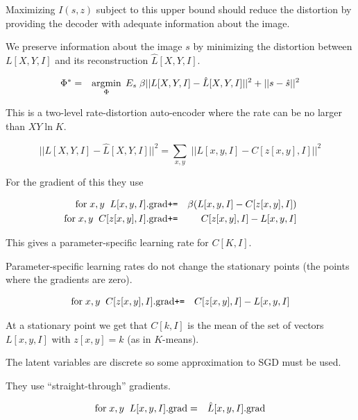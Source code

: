 {\vfill
Maximizing $I(s,z)$ subject to this upper bound should reduce the distortion by providing the decoder with adequate information
about the image.


We preserve information about the image $s$ by minimizing the distortion between $L[X,Y,I]$ and its reconstruction $\hat{L}[X,Y,I]$.

\vfill
\begin{eqnarray*}
\Phi^* & = & \operatorname*{argmin}_\Phi \;E_s\; \beta||L[X,Y,I] - \hat{L}[X,Y,I]||^2 + ||s -\hat{s}||^2
\end{eqnarray*}

\vfill
This is a two-level rate-distortion auto-encoder where the rate can be no larger than $XY\ln K$.


$$||L[X,Y,I] - \hat{L}[X,Y,I]||^2 = \sum_{x,y}\;||L[x,y,I] - C[z[x,y],I]||^2$$

\vfill
For the gradient of this they use

\begin{eqnarray*}
\mathrm{for}\;x,y\;\;L[x,y,I].\mathrm{grad} & \mbox{\tt +=} & \beta({L}[x,y,I]- C[z[x,y],I]) \\
\mathrm{for}\;x,y\;\;C[z[x,y],I].\mathrm{grad} & \mbox{\tt +=} & C[z[x,y],I] - L[x,y,I]
\end{eqnarray*}

\vfill
This gives a parameter-specific learning rate for $C[K,I]$.

\vfill
Parameter-specific learning rates do not change the stationary points (the points where the gradients are zero).


\begin{eqnarray*}
\mathrm{for}\;x,y\;\;C[z[x,y],I].\mathrm{grad} & \mbox{\tt +=} & C[z[x,y],I] - L[x,y,I]
\end{eqnarray*}

\vfill
At a stationary point we get that $C[k,I]$ is the mean of the set of vectors $L[x,y,I]$ with $z[x,y] = k$ (as in $K$-means).


The latent variables are discrete so some approximation to SGD must be used.

\vfill
They use ``straight-through'' gradients.

\begin{eqnarray*}
\mathrm{for}\;x,y\;\;L[x,y,I].\mathrm{grad} & = & \hat{L}[x,y,I].\mathrm{grad}
\end{eqnarray*}

}
